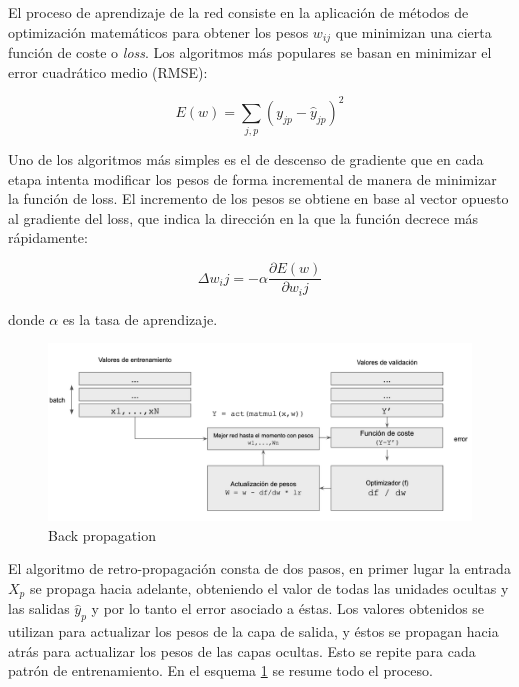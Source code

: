 El proceso de aprendizaje de la red consiste en la aplicación de métodos de optimización matemáticos para obtener los pesos $w_{ij}$ 
que minimizan una cierta función de coste o \textit{loss}. Los algoritmos más populares se basan en minimizar el error cuadrático 
medio (RMSE):

\begin{equation}
    E(w) = \sum_{j,p}(y_{jp}-\hat{y}_{jp})^2
\end{equation}

Uno de los algoritmos más simples es el de descenso de gradiente que en cada etapa intenta modificar los pesos de forma incremental de manera 
de minimizar la función de loss. El incremento de los pesos se obtiene en base al vector opuesto al gradiente del loss,
 que indica la dirección en la que la función decrece más rápidamente:

 \begin{equation}
    \Delta w_ij = -\alpha \frac{\partial E(w)}{\partial w_ij}
\end{equation}

donde $\alpha$ es la tasa de aprendizaje. 


\begin{figure}[h!]
    \begin{center}
      \includegraphics[height=2.in]{Figures/back_prop.png}
      \caption{ Back propagation }
      \label{backprop}
    \end{center}
  \end{figure}


El algoritmo de retro-propagación consta de dos pasos, en primer lugar la entrada $X_p$ se propaga hacia adelante, obteniendo el valor
de todas las unidades ocultas y las salidas $\hat{y}_p$ y por lo tanto el error asociado a éstas. Los valores obtenidos se utilizan para actualizar
los pesos de la capa de salida, y éstos se propagan hacia atrás para actualizar los pesos de las capas ocultas. Esto
 se repite para cada patrón de entrenamiento. En el esquema \ref{backprop} se resume todo el proceso.


